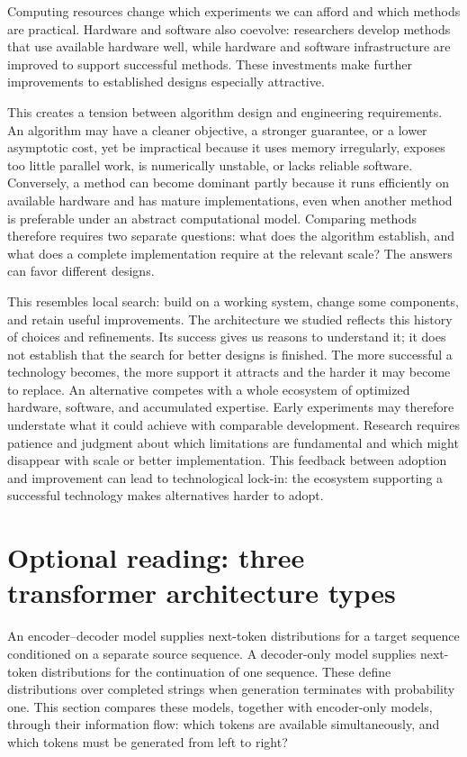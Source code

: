 \documentclass[11pt,twoside]{article}
\theoremstyle{plain}
\theoremstyle{definition}
\theoremstyle{remark}
\begin{document}
Computing resources change which experiments we can afford and which methods
are practical. Hardware and software also coevolve: researchers develop methods
that use available hardware well, while hardware and software infrastructure
are improved to support successful methods. These investments make further
improvements to established designs especially attractive.

This creates a tension between algorithm design and engineering requirements.
An algorithm may have a cleaner objective, a stronger guarantee, or a lower
asymptotic cost, yet be impractical because it uses memory irregularly, exposes
too little parallel work, is numerically unstable, or lacks reliable software.
Conversely, a method can become dominant partly because it runs efficiently on
available hardware and has mature implementations, even when another method is
preferable under an abstract computational model. Comparing methods therefore
requires two separate questions: what does the algorithm establish, and what
does a complete implementation require at the relevant scale? The answers can
favor different designs.

This resembles local search: build on a working system, change some components,
and retain useful improvements. The architecture we studied reflects this
history of choices and refinements. Its success gives us reasons to understand
it; it does not establish that the search for better designs is finished.
The more successful a technology becomes, the more support it attracts and
the harder it may become to replace. An alternative competes with a whole
ecosystem of optimized hardware, software, and accumulated expertise. Early
experiments may therefore understate what it could achieve with comparable
development. Research requires patience and judgment about which limitations
are fundamental and which might disappear with scale or better implementation.
This feedback between adoption and improvement can lead to technological
lock-in: the ecosystem supporting a successful technology makes alternatives
harder to adopt.

\section{Optional reading: three transformer architecture types}
\label{app:transformer-arrangements}

An encoder--decoder model supplies next-token distributions for a target
sequence conditioned on a separate source sequence. A decoder-only model
supplies next-token distributions for the continuation of one sequence.
These define distributions over completed strings when generation
terminates with probability one. This section compares
these models, together with encoder-only models, through their information
flow: which tokens are available simultaneously, and which tokens must be
generated from left to right?
\end{document}
